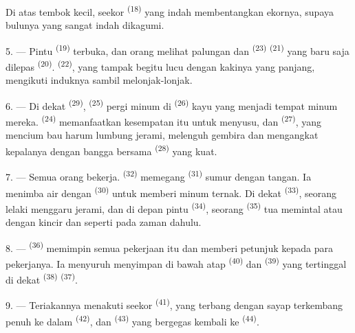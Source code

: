 Di atas tembok kecil, seekor  \textsuperscript{(18)} yang
indah membentangkan ekornya, supaya bulunya yang sangat indah
dikagumi.

\VUsaut{3.0mm}

5. --- Pintu  \textsuperscript{(19)} terbuka, dan
orang melihat palungan dan  \textsuperscript{(23)}
 \textsuperscript{(21)} yang baru saja dilepas
 \textsuperscript{(20)}. 
\textsuperscript{(22)}, yang tampak begitu lucu dengan kakinya yang
panjang, mengikuti induknya sambil melonjak-lonjak.

6. --- Di dekat  \textsuperscript{(29)},  \textsuperscript{(25)} pergi minum di 
\textsuperscript{(26)} kayu yang menjadi tempat minum mereka.
 \textsuperscript{(24)} memanfaatkan kesempatan itu
untuk menyusu, dan  \textsuperscript{(27)}, yang
mencium bau harum lumbung jerami, melenguh gembira dan mengangkat
kepalanya dengan bangga bersama 
\textsuperscript{(28)} yang kuat.

7. --- Semua orang bekerja. 
\textsuperscript{(32)} memegang  \textsuperscript{(31)}
sumur dengan tangan. Ia menimba air dengan 
\textsuperscript{(30)} untuk memberi minum ternak. Di dekat
 \textsuperscript{(33)}, seorang lelaki menggaru
jerami, dan di depan pintu  \textsuperscript{(34)},
seorang  \textsuperscript{(35)} tua memintal
 atau  dengan kincir dan 
seperti pada zaman dahulu.

\VUsaut{3.0mm}
\VUsaut{3.0mm}

8. ---  \textsuperscript{(36)} memimpin semua pekerjaan
itu dan memberi petunjuk kepada para pekerjanya. Ia menyuruh
menyimpan di bawah atap  \textsuperscript{(40)} dan
 \textsuperscript{(39)} yang tertinggal di dekat
 \textsuperscript{(38)} 
\textsuperscript{(37)}.

9. --- Teriakannya menakuti seekor 
\textsuperscript{(41)}, yang terbang dengan sayap terkembang penuh ke
dalam  \textsuperscript{(42)}, dan
 \textsuperscript{(43)} yang bergegas kembali
ke  \textsuperscript{(44)}.

